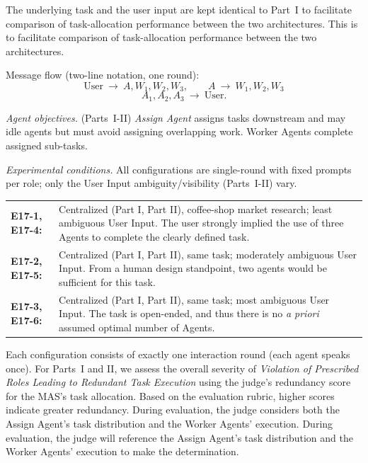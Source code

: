 \documentclass[11pt, letterpaper, shortlabels]{berkeley}
\begin{document}
{The underlying task and the user input are kept identical to Part~I to facilitate comparison of task-allocation performance between the two architectures. This is to facilitate comparison of task-allocation performance between the two architectures.


Message flow (two-line notation, one round):
\[
\text{User}\ \rightarrow\ A, W_1, W_2, W_3,\qquad
A\ \rightarrow\ W_1, W_2, W_3
\]
\[
A_1,A_2,A_3\ \rightarrow\ \text{User}.
\]

\emph{Agent objectives.} 
(Parts~I-II) \emph{Assign Agent} assigns tasks downstream and may idle agents but must avoid assigning overlapping work. Worker Agents complete assigned sub-tasks.




\emph{Experimental conditions.}
All configurations are single-round with fixed prompts per role; 
only the User Input ambiguity/visibility (Parts~I-II) vary.

\begin{flushleft}
\begin{tabularx}{\textwidth}{@{}lX@{}}
\textbf{E17-1, E17-4:} & Centralized (Part I, Part II), coffee-shop market research; least ambiguous User Input. 
The user strongly implied the use of three Agents to complete the clearly defined task. \\[4pt]

\textbf{E17-2, E17-5:} & Centralized (Part I, Part II), same task; moderately ambiguous User Input. 
From a human design standpoint, two agents would be sufficient for this task. \\[4pt]

\textbf{E17-3, E17-6:} & Centralized (Part I, Part II), same task; most ambiguous User Input. 
The task is open-ended, and thus there is no \textit{a priori} assumed optimal number of Agents. \\
\end{tabularx}
\end{flushleft}

Each configuration consists of exactly one interaction round (each agent speaks once). 
For Parts~I and II, we assess the overall severity of \emph{Violation of Prescribed Roles Leading to Redundant Task Execution} using the judge’s redundancy score for the MAS’s task allocation. Based on the evaluation rubric, higher scores indicate greater redundancy. During evaluation, the judge considers both the Assign Agent’s task distribution and the Worker Agents’ execution. During evaluation, the judge will reference the Assign Agent’s task distribution and the Worker Agents’ execution to make the determination.



}
\end{document}
